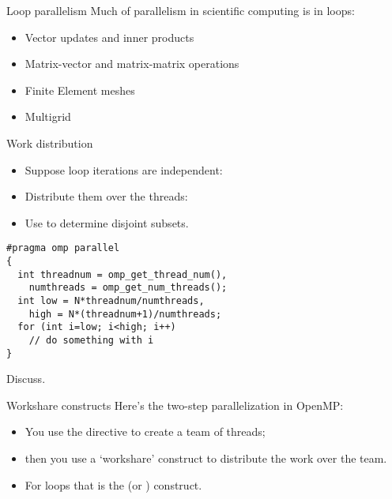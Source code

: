 
\begin{numberedframe}{Loop parallelism}
  Much of parallelism in scientific computing is in loops:
  \begin{itemize}
  \item Vector updates and inner products
  \item Matrix-vector and matrix-matrix operations
  \item Finite Element meshes
  \item Multigrid
  \end{itemize}
\end{numberedframe}

\begin{numberedframe}{Work distribution}
  \begin{itemize}
  \item Suppose loop iterations are independent:
  \item Distribute them over the threads:
  \item Use  to determine disjoint subsets.
  \end{itemize}
\begin{lstlisting}
#pragma omp parallel
{
  int threadnum = omp_get_thread_num(),
    numthreads = omp_get_num_threads();
  int low = N*threadnum/numthreads,
    high = N*(threadnum+1)/numthreads;
  for (int i=low; i<high; i++)
    // do something with i
}
\end{lstlisting}
Discuss.
\end{numberedframe}

\begin{numberedframe}{Workshare constructs}
  Here's the two-step parallelization in OpenMP:
  \begin{itemize}
  \item You use the  directive to create a team of
    threads;
  \item then you use a `workshare' construct to distribute the
    work over the team.
  \item For loops that is the  (or ) construct.
  \end{itemize}
\end{numberedframe}

